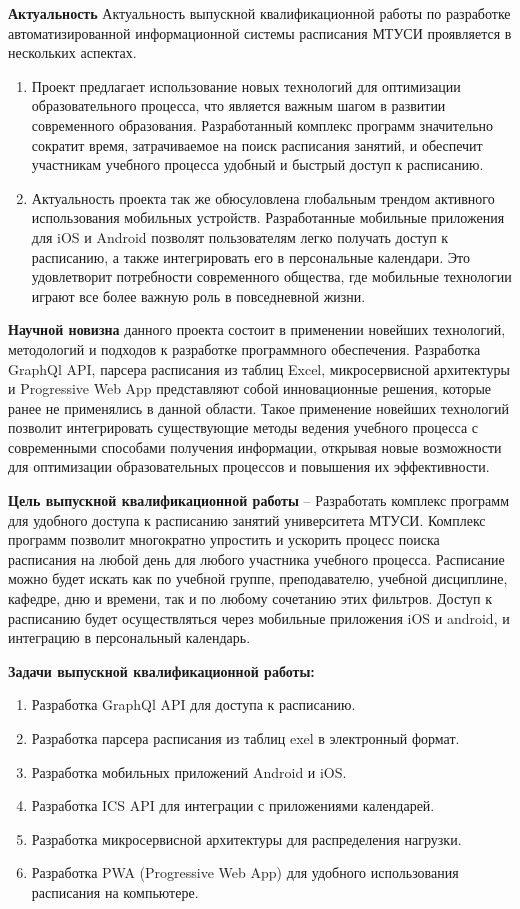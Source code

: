 \textbf{Актуальность}
Актуальность выпускной квалификационной работы по разработке автоматизированной информационной системы расписания МТУСИ проявляется в нескольких аспектах.
\begin{enumerate}
    \item Проект предлагает использование новых технологий для оптимизации образовательного процесса, что является важным шагом в развитии современного образования. 
    Разработанный комплекс программ значительно сократит время, затрачиваемое на поиск расписания занятий, и обеспечит участникам учебного процесса 
    удобный и быстрый доступ к расписанию.
    \item Актуальность проекта так же обюсуловлена глобальным трендом активного использования мобильных устройств. 
    Разработанные мобильные приложения для iOS и Android позволят пользователям легко получать доступ к расписанию, 
    а также интегрировать его в персональные календари. Это удовлетворит потребности современного общества, где мобильные технологии играют все более важную роль в повседневной жизни.
\end{enumerate}

\textbf{Научной новизна} данного проекта состоит в применении новейших технологий, методологий и подходов к разработке программного обеспечения. 
Разработка GraphQl API, парсера расписания из таблиц Excel, микросервисной архитектуры и Progressive Web App представляют собой инновационные решения, 
которые ранее не применялись в данной области. 
Такое применение новейших технологий позволит интегрировать существующие методы ведения учебного процесса 
с современными способами получения информации, открывая новые возможности для оптимизации образовательных процессов и повышения их эффективности.

\newpage

\textbf{Цель выпускной квалификационной работы} -- Разработать комплекс программ для удобного доступа к расписанию занятий университета МТУСИ.
Комплекс программ позволит многократно упростить и ускорить процесс поиска расписания на любой день для любого участника учебного процесса.
Расписание можно будет искать как по учебной группе, преподавателю, учебной дисциплине, кафедре, дню и времени,
так и по любому сочетанию этих фильтров.
Доступ к расписанию будет осуществляться через мобильные приложения iOS и android, и интеграцию в персональный календарь.

\textbf{Задачи выпускной квалификационной работы:}
\begin{enumerate}
    \item Разработка GraphQl API для доступа к расписанию.
    \item Разработка парсера расписания из таблиц exel в электронный формат.
    \item Разработка мобильных приложений Android и iOS.
    \item Разработка ICS API для интеграции с приложениями календарей.
    \item Разработка микросервисной архитектуры для распределения нагрузки.
    \item Разработка PWA (Progressive Web App) для удобного использования расписания на компьютере.
\end{enumerate}
